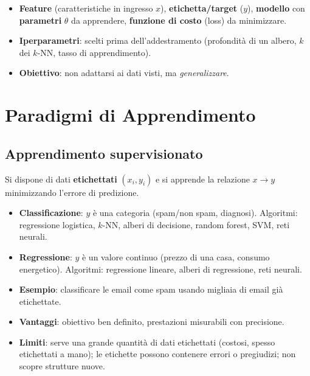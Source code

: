 \begin{itemize}
    \item \textbf{Feature} (caratteristiche in ingresso $x$), \textbf{etichetta/target} ($y$), \textbf{modello} con \textbf{parametri} $\theta$ da apprendere, \textbf{funzione di costo} (loss) da minimizzare.
    \item \textbf{Iperparametri}: scelti prima dell'addestramento (profondità di un albero, $k$ dei $k$-NN, tasso di apprendimento).
    \item \textbf{Obiettivo}: non adattarsi ai dati visti, ma \emph{generalizzare}.
\end{itemize}

\section{Paradigmi di Apprendimento}

\subsection{Apprendimento supervisionato}
Si dispone di dati \textbf{etichettati} $(x_i, y_i)$ e si apprende la relazione $x \to y$ minimizzando l'errore di predizione.
\begin{itemize}
    \item \textbf{Classificazione}: $y$ è una categoria (spam/non spam, diagnosi). Algoritmi: regressione logistica, $k$-NN, alberi di decisione, random forest, SVM, reti neurali.
    \item \textbf{Regressione}: $y$ è un valore continuo (prezzo di una casa, consumo energetico). Algoritmi: regressione lineare, alberi di regressione, reti neurali.
    \item \textbf{Esempio}: classificare le email come spam usando migliaia di email già etichettate.
    \item \textbf{Vantaggi}: obiettivo ben definito, prestazioni misurabili con precisione.
    \item \textbf{Limiti}: serve una grande quantità di dati etichettati (costosi, spesso etichettati a mano); le etichette possono contenere errori o pregiudizi; non scopre strutture nuove.
\end{itemize}


